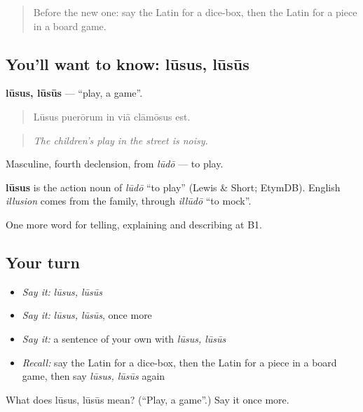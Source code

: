 \begin{quote}
Before the new one: say the Latin for a dice-box, then the Latin for a piece in a board game.
\end{quote}

\subsection*{You'll want to know: lūsus, lūsūs}
\textbf{lūsus, lūsūs} — \textquotedblleft{}play, a game\textquotedblright{}.

\begin{quote}
Lūsus puerōrum in viā clāmōsus est.
\end{quote}

\begin{quote}
\emph{The children's play in the street is noisy.}
\end{quote}

Masculine, fourth declension, from \emph{lūdō} — to play.

\begin{cousinweb}
\textbf{lūsus} is the action noun of \emph{lūdō} \textquotedblleft{}to play\textquotedblright{} (Lewis \& Short; EtymDB). English \emph{illusion} comes from the family, through \emph{illūdō} \textquotedblleft{}to mock\textquotedblright{}.
\end{cousinweb}

\begin{grammarlens}[title={What you've built}]
One more word for telling, explaining and describing at B1.
\end{grammarlens}

\subsection*{Your turn}
\begin{itemize}
\raggedright
  \item \emph{Say it:} \emph{lūsus, lūsūs}
  \item \emph{Say it:} \emph{lūsus, lūsūs}, once more
  \item \emph{Say it:} a sentence of your own with \emph{lūsus, lūsūs}
  \item \emph{Recall:} say the Latin for a dice-box, then the Latin for a piece in a board game, then say \emph{lūsus, lūsūs} again
\end{itemize}

\begin{tcolorbox}[breakable,colback=teal!4,colframe=teal!35!black,title={Before you move on}]
What does lūsus, lūsūs mean? (\textquotedblleft{}Play, a game\textquotedblright{}.) Say it once more.
\end{tcolorbox}
